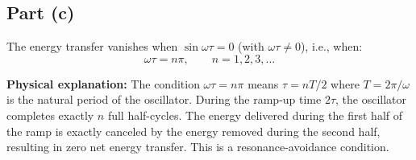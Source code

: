 \documentclass[12pt]{article}
\begin{document}
\subsection*{Part (c)}

The energy transfer vanishes when $\sin\omega\tau = 0$ (with $\omega\tau \neq 0$), i.e., when:
\[
\boxed{\omega\tau = n\pi, \qquad n = 1, 2, 3, \ldots}
\]

\textbf{Physical explanation:} The condition $\omega\tau = n\pi$ means $\tau = nT/2$ where $T = 2\pi/\omega$ is the natural period of the oscillator. During the ramp-up time $2\tau$, the oscillator completes exactly $n$ full half-cycles. The energy delivered during the first half of the ramp is exactly canceled by the energy removed during the second half, resulting in zero net energy transfer. This is a resonance-avoidance condition.
\end{document}
